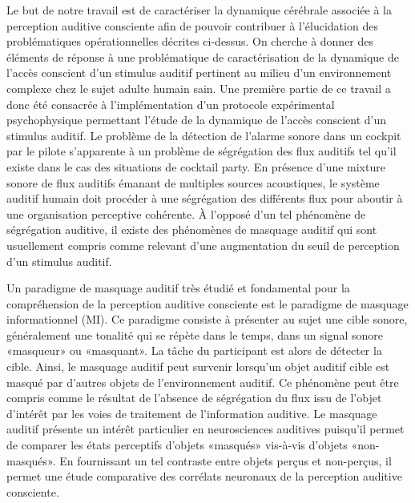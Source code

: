 Le but de notre travail est de caractériser la dynamique cérébrale associée à la perception auditive consciente afin de pouvoir contribuer à l'élucidation des problématiques opérationnelles décrites ci-dessus. 
On cherche à donner des éléments de réponse à une problématique de caractérisation de la dynamique de l'accès conscient d'un stimulus auditif pertinent au milieu d'un environnement complexe chez le sujet adulte humain sain. 
Une première partie de ce travail a donc été consacrée à l'implémentation d'un protocole expérimental psychophysique permettant l'étude de la dynamique de l'accès conscient d'un stimulus auditif. 
Le problème de la détection de l'alarme sonore dans un cockpit par le pilote s'apparente à un problème de ségrégation des flux auditifs tel qu'il existe dans le cas des situations de cocktail party. 
En présence d'une mixture sonore de flux auditifs émanant de multiples sources acoustiques, le système auditif humain doit procéder à une ségrégation des différents flux pour aboutir à une organisation perceptive cohérente. 
À l'opposé d'un tel phénomène de ségrégation auditive, il existe des phénomènes de masquage auditif qui sont usuellement compris comme relevant d'une augmentation du seuil de perception d'un stimulus auditif. 

Un paradigme de masquage auditif très étudié et fondamental pour la compréhension de la perception auditive consciente est le paradigme de masquage informationnel (MI). 
Ce paradigme consiste à présenter au sujet une cible sonore, généralement une tonalité qui se répète dans le temps, dans un signal sonore «masqueur» ou «masquant». 
La tâche du participant est alors de détecter la cible. 
Ainsi, le masquage auditif peut survenir lorsqu'un objet auditif cible est masqué par d'autres objets de l'environnement auditif. 
Ce phénomène peut être compris comme le résultat de l'absence de ségrégation du flux issu de l'objet d'intérêt par les voies de traitement de l'information auditive. 
Le masquage auditif présente un intérêt particulier en neurosciences auditives puisqu'il permet de comparer les états perceptifs d'objets «masqués» vis-à-vis d'objets «non-masqués». 
En fournissant un tel contraste entre objets perçus et non-perçus, il permet une étude comparative des corrélats neuronaux de la perception auditive consciente. 

